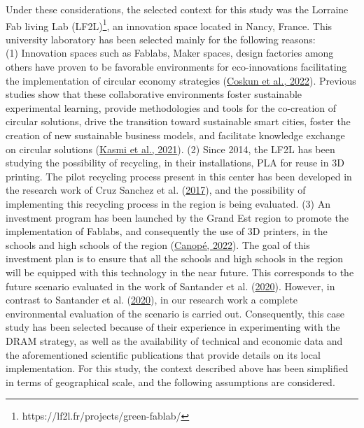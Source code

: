 \documentclass[12pt]{elsarticle} %
\begin{document}
Under these considerations, the selected context for this study was the Lorraine Fab living Lab (LF2L)\footnote{https://lf2l.fr/projects/green-fablab/}, an innovation space located in Nancy, France. This university laboratory has been selected mainly for the following reasons:\\
(1) Innovation spaces such as Fablabs, Maker spaces, design factories among others have proven to be favorable environments for eco-innovations facilitating the implementation of circular economy strategies (\protect\hyperlink{ref-coskun2022}{Coskun et al., 2022}).
Previous studies show that these collaborative environments foster sustainable experimental learning, provide methodologies and tools for the co-creation of circular solutions, drive the transition toward sustainable smart cities, foster the creation of new sustainable business models, and facilitate knowledge exchange on circular solutions (\protect\hyperlink{ref-Kasmi2021}{Kasmi et al., 2021}).
(2) Since 2014, the LF2L has been studying the possibility of recycling, in their installations, PLA for reuse in 3D printing.
The pilot recycling process present in this center has been developed in the research work of Cruz Sanchez et al. (\protect\hyperlink{ref-CruzSanchez2017}{2017}), and the possibility of implementing this recycling process in the region is being evaluated.
(3) An investment program has been launched by the Grand Est region to promote the implementation of Fablabs, and consequently the use of 3D printers, in the schools and high schools of the region (\protect\hyperlink{ref-canope2022}{Canopé, 2022}).
The goal of this investment plan is to ensure that all the schools and high schools in the region will be equipped with this technology in the near future. This corresponds to the future scenario evaluated in the work of Santander et al. (\protect\hyperlink{ref-Santander2020}{2020}).
However, in contrast to Santander et al. (\protect\hyperlink{ref-Santander2020}{2020}), in our research work a complete environmental evaluation of the scenario is carried out. Consequently, this case study has been selected because of their experience in experimenting with the DRAM strategy, as well as the availability of technical and economic data and the aforementioned scientific publications that provide details on its local implementation.
For this study, the context described above has been simplified in terms of geographical scale, and the following assumptions are considered.
\end{document}
